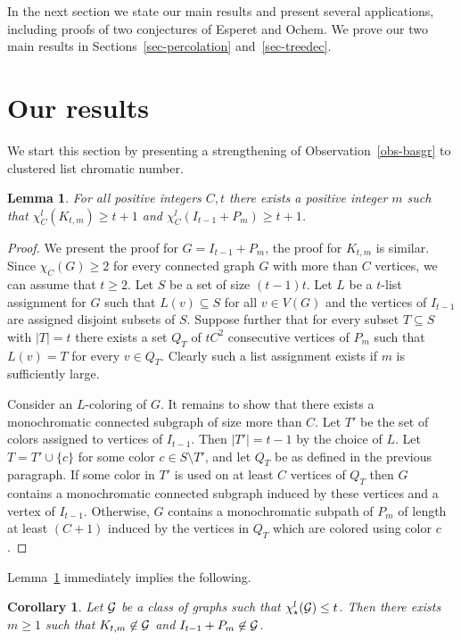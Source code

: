 \documentclass[12pt]{article}
\newcommand{\GG}{{\cal G}}
\newtheorem{corollary}[theorem]{Corollary}
\newtheorem{lemma}[theorem]{Lemma}
\begin{document}
In the next section we state our main results and present several applications, including proofs of two conjectures of Esperet and Ochem.
We prove our two main results in Sections~\ref{sec-percolation} and~\ref{sec-treedec}.

\section{Our results}

We start this section by presenting a strengthening of Observation~\ref{obs-basgr} to clustered list chromatic number.

\begin{lemma}\label{lem-listksm} 
For all positive integers $C,t$ there exists a positive integer $m$ such that $\chi_C^l(K_{t,m}) \geq t+1$ and $\chi_C^l(I_{t-1}+P_m) \geq t+1$.
\end{lemma}

\begin{proof} We present the proof for $G=I_{t-1}+P_m$, the proof for $K_{t,m}$ is similar.
Since $\chi_C(G)\ge 2$ for every connected graph $G$ with more than $C$ vertices, we can assume that $t\ge 2$.
Let $S$ be a set of size $(t-1)t$.
Let $L$ be a $t$-list assignment for $G$ such that $L(v) \subseteq S$ for all $v \in V(G)$ and the vertices of $I_{t-1}$
are assigned disjoint subsets of $S$. Suppose further that for every subset $T \subseteq S$ with $|T|=t$ there exists a set $Q_T$ of
$tC^2$ consecutive vertices of $P_m$ such that $L(v)=T$ for every $v \in Q_T$. Clearly such a list assignment exists if $m$ is sufficiently large.

Consider an $L$-coloring of $G$. It remains to show that there exists a monochromatic connected subgraph of size more than $C$. Let $T'$
be the set of colors assigned to vertices of $I_{t-1}$. Then $|T'|=t-1$ by the choice of $L$. Let $T=T' \cup \{c\}$ for some color $c \in S \setminus T'$,
and let $Q_T$ be as defined in the previous paragraph. If some color in $T'$ is used on at least $C$ vertices of $Q_T$ then $G$ contains
a monochromatic connected subgraph induced by these vertices and a vertex of $I_{t-1}$. Otherwise, $G$ contains a monochromatic subpath
of $P_m$ of length at least $(C+1)$ induced by the vertices in $Q_T$ which are colored using color $c$.
\end{proof}

Lemma~\ref{lem-listksm} immediately implies the following.

\begin{corollary}\label{cor-liststar}
Let $\GG$ be a class of graphs such that $\chi^l_\star(\GG)\le t$. Then there exists $m\ge 1$ such that
$K_{t,m}\not\in \GG$ and $I_{t-1}+P_m\not\in\GG$.
\end{corollary}
\end{document}
